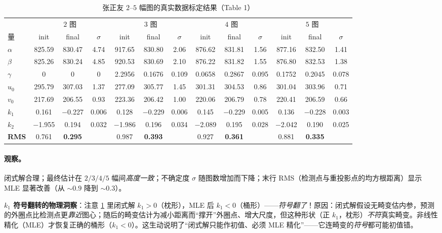 \begin{table}[ht]\centering\scriptsize
\caption{张正友 $2$--$5$ 幅图的真实数据标定结果（Table 1）\cite{zhang2000calibration}}
\label{tab:calib-table1}
\begin{tabular}{lccc ccc ccc ccc}
\toprule
 & \multicolumn{3}{c}{$2$ 图} & \multicolumn{3}{c}{$3$ 图} & \multicolumn{3}{c}{$4$ 图} & \multicolumn{3}{c}{$5$ 图}\\
\cmidrule(lr){2-4}\cmidrule(lr){5-7}\cmidrule(lr){8-10}\cmidrule(lr){11-13}
量 & init & final & $\sigma$ & init & final & $\sigma$ & init & final & $\sigma$ & init & final & $\sigma$\\
\midrule
$\alpha$ & 825.59 & 830.47 & 4.74 & 917.65 & 830.80 & 2.06 & 876.62 & 831.81 & 1.56 & 877.16 & 832.50 & 1.41\\
$\beta$ & 825.26 & 830.24 & 4.85 & 920.53 & 830.69 & 2.10 & 876.22 & 831.82 & 1.55 & 876.80 & 832.53 & 1.38\\
$\gamma$ & 0 & 0 & 0 & 2.2956 & 0.1676 & 0.109 & 0.0658 & 0.2867 & 0.095 & 0.1752 & 0.2045 & 0.078\\
$u_0$ & 295.79 & 307.03 & 1.37 & 277.09 & 305.77 & 1.45 & 301.31 & 304.53 & 0.86 & 301.04 & 303.96 & 0.71\\
$v_0$ & 217.69 & 206.55 & 0.93 & 223.36 & 206.42 & 1.00 & 220.06 & 206.79 & 0.78 & 220.41 & 206.59 & 0.66\\
$k_1$ & 0.161 & $-$0.227 & 0.006 & 0.128 & $-$0.229 & 0.006 & 0.145 & $-$0.229 & 0.005 & 0.136 & $-$0.228 & 0.003\\
$k_2$ & $-$1.955 & 0.194 & 0.032 & $-$1.986 & 0.196 & 0.034 & $-$2.089 & 0.195 & 0.028 & $-$2.042 & 0.190 & 0.025\\
\textbf{RMS} & 0.761 & \textbf{0.295} & & 0.987 & \textbf{0.393} & & 0.927 & \textbf{0.361} & & 0.881 & \textbf{0.335} & \\
\bottomrule
\end{tabular}
\end{table}

\paragraph{观察。}
闭式解合理；最终估计在 $2/3/4/5$ 幅间\emph{高度一致}；不确定度 $\sigma$ 随图数增加而下降；末行 RMS（检测点与重投影点的均方根距离）显示 MLE 显著改善（从 $\sim0.9$ 降到 $\sim0.3$）。

\begin{insight}
\textbf{$k_1$ 符号翻转的物理洞察}\cite{zhang2000calibration}：注意 \cref{tab:calib-table1} 里闭式解 $k_1>0$（枕形），MLE 后 $k_1<0$（桶形）——\emph{符号翻了}！原因：闭式解假设无畸变估内参，预测的外圈点比检测点更\emph{靠近}图心；随后的畸变估计为减小距离而“撑开”外圈点、增大尺度，但这种形状（正 $k_1$，枕形）\emph{不符}真实畸变。非线性精化（MLE）才恢复正确的桶形（$k_1<0$）。这生动说明了“闭式解只能作初值、必须 MLE 精化”——它连畸变的\emph{符号}都可能初值错。
\end{insight}

